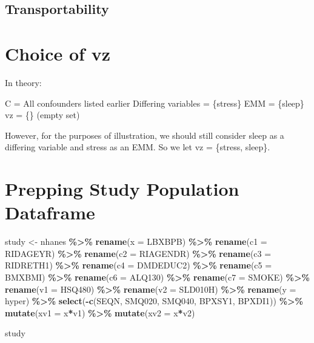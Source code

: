 \documentclass[
]{article}
\newenvironment{Shaded}{\begin{snugshade}}{\end{snugshade}}
\newcommand{\AttributeTok}[1]{\textcolor[rgb]{0.13,0.29,0.53}{#1}}
\newcommand{\FunctionTok}[1]{\textcolor[rgb]{0.13,0.29,0.53}{\textbf{#1}}}
\newcommand{\NormalTok}[1]{#1}
\newcommand{\OtherTok}[1]{\textcolor[rgb]{0.56,0.35,0.01}{#1}}
\newcommand{\SpecialCharTok}[1]{\textcolor[rgb]{0.81,0.36,0.00}{\textbf{#1}}}
\begin{document}
\subsection{Transportability}\label{transportability}

\section{Choice of vz}\label{choice-of-vz}

In theory:

C = All confounders listed earlier Differing variables = \{stress\} EMM
= \{sleep\} vz = \{\} (empty set)

However, for the purposes of illustration, we should still consider
sleep as a differing variable and stress as an EMM. So we let vz =
\{stress, sleep\}.

\section{Prepping Study Population
Dataframe}\label{prepping-study-population-dataframe}

\begin{Shaded}
\begin{Highlighting}[]
\NormalTok{study }\OtherTok{\textless{}{-}}\NormalTok{ nhanes }\SpecialCharTok{\%\textgreater{}\%} 
  \FunctionTok{rename}\NormalTok{(}\AttributeTok{x =}\NormalTok{ LBXBPB) }\SpecialCharTok{\%\textgreater{}\%} 
  \FunctionTok{rename}\NormalTok{(}\AttributeTok{c1 =}\NormalTok{ RIDAGEYR) }\SpecialCharTok{\%\textgreater{}\%} 
  \FunctionTok{rename}\NormalTok{(}\AttributeTok{c2 =}\NormalTok{ RIAGENDR) }\SpecialCharTok{\%\textgreater{}\%} 
  \FunctionTok{rename}\NormalTok{(}\AttributeTok{c3 =}\NormalTok{ RIDRETH1) }\SpecialCharTok{\%\textgreater{}\%} 
  \FunctionTok{rename}\NormalTok{(}\AttributeTok{c4 =}\NormalTok{ DMDEDUC2) }\SpecialCharTok{\%\textgreater{}\%} 
  \FunctionTok{rename}\NormalTok{(}\AttributeTok{c5 =}\NormalTok{ BMXBMI) }\SpecialCharTok{\%\textgreater{}\%} 
  \FunctionTok{rename}\NormalTok{(}\AttributeTok{c6 =}\NormalTok{ ALQ130) }\SpecialCharTok{\%\textgreater{}\%} 
  \FunctionTok{rename}\NormalTok{(}\AttributeTok{c7 =}\NormalTok{ SMOKE) }\SpecialCharTok{\%\textgreater{}\%} 
  \FunctionTok{rename}\NormalTok{(}\AttributeTok{v1 =}\NormalTok{ HSQ480) }\SpecialCharTok{\%\textgreater{}\%} 
  \FunctionTok{rename}\NormalTok{(}\AttributeTok{v2 =}\NormalTok{ SLD010H) }\SpecialCharTok{\%\textgreater{}\%} 
  \FunctionTok{rename}\NormalTok{(}\AttributeTok{y =}\NormalTok{ hyper) }\SpecialCharTok{\%\textgreater{}\%} 
  \FunctionTok{select}\NormalTok{(}\SpecialCharTok{{-}}\FunctionTok{c}\NormalTok{(SEQN, SMQ020, SMQ040, BPXSY1, BPXDI1)) }\SpecialCharTok{\%\textgreater{}\%} 
  \FunctionTok{mutate}\NormalTok{(}\AttributeTok{xv1 =}\NormalTok{ x}\SpecialCharTok{*}\NormalTok{v1) }\SpecialCharTok{\%\textgreater{}\%} 
  \FunctionTok{mutate}\NormalTok{(}\AttributeTok{xv2 =}\NormalTok{ x}\SpecialCharTok{*}\NormalTok{v2)}

\NormalTok{study}
\end{Highlighting}
\end{Shaded}
\end{document}
